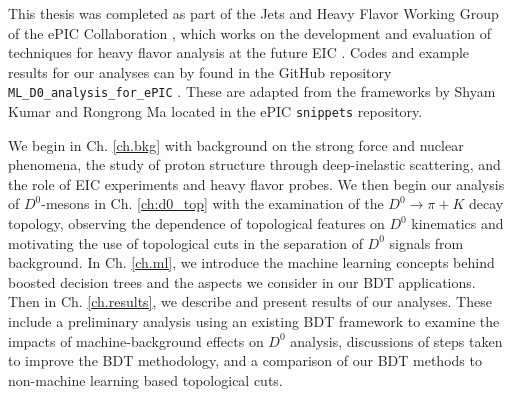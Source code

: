 This thesis was completed as part of the Jets and Heavy Flavor Working Group of the ePIC Collaboration \cite{ePIC}, which works on the development and evaluation of techniques for heavy flavor analysis at the future EIC \cite{EIC}. Codes and example results for our analyses can by found in the GitHub repository \texttt{ML\_D0\_analysis\_for\_ePIC} \cite{github}. These are adapted from the frameworks by Shyam Kumar \cite{Shyam_analysis,Shyam_ml} and Rongrong Ma \cite{Rongrong_jobs} located in the ePIC \texttt{snippets} repository.

We begin in Ch. \ref{ch.bkg} with background on the strong force and nuclear phenomena, the study of proton structure through deep-inelastic scattering, and the role of EIC experiments and heavy flavor probes. We then begin our analysis of $D^0$-mesons in Ch. \ref{ch:d0_top} with the examination of the $D^0\rightarrow\pi+K$ decay topology, observing the dependence of topological features on $D^0$ kinematics and motivating the use of topological cuts in the separation of $D^0$ signals from background. In Ch. \ref{ch.ml}, we introduce the machine learning concepts behind boosted decision trees and the aspects we consider in our BDT applications. Then in Ch. \ref{ch.results}, we describe and present results of our analyses. These include a preliminary analysis using an existing BDT framework to examine the impacts of machine-background effects on $D^0$ analysis, discussions of steps taken to improve the BDT methodology, and a comparison of our BDT methods to non-machine learning based topological cuts. 